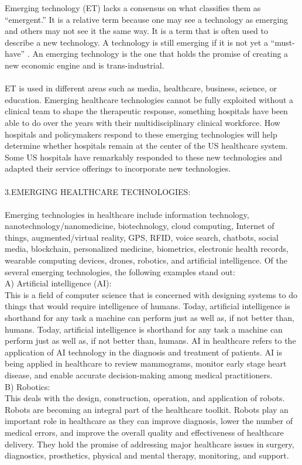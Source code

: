 \documentclass{article}
\begin{document}
Emerging technology (ET) lacks a consensus on what classifies them as “emergent.” It is a relative term because one may see a 
technology as emerging and others may not see it the same way. It is a term that is often used to describe a new technology. A 
technology is still emerging if it is not yet a “must-have” . An emerging technology is the one that holds the promise of creating 
a new economic engine and is trans-industrial.\\ 
\\
ET is used in different areas such as media, healthcare, business, science, or education. Emerging healthcare technologies cannot 
be fully exploited without a clinical team to shape the therapeutic response, something hospitals have been able to do over the 
years with their multidisciplinary clinical workforce. How hospitals and policymakers respond to these emerging technologies will 
help determine whether hospitals remain at the center of the US healthcare system. Some US hospitals have remarkably responded 
to these new technologies and adapted their service offerings to incorporate new technologies.
\\
\\
3.EMERGING HEALTHCARE TECHNOLOGIES:\\
\\
Emerging technologies in healthcare include information technology, nanotechnology/nanomedicine, biotechnology, cloud 
computing, Internet of things, augmented/virtual reality, GPS, RFID, voice search, chatbots, social media, blockchain, 
personalized medicine, biometrics, electronic health records, wearable computing devices, drones, robotics, and artificial 
intelligence. Of the several emerging technologies, the following examples stand out:\\
A) Artificial intelligence (AI):\\
 This is a field of computer science that is concerned with designing systems to do things that 
would require intelligence of humans. Today, artificial intelligence is shorthand for any task a machine can perform just as 
well as, if not better than, humans. Today, artificial intelligence is shorthand for any task a machine can perform just as 
well as, if not better than, humans. AI in healthcare refers to the application of AI technology in
 the diagnosis and treatment of patients. AI is being applied in healthcare to review mammograms, monitor early stage heart
 disease, and enable accurate decision-making among medical practitioners. \\
B) Robotics:\\
This deals with the design, construction, operation, and application of robots. Robots are becoming an integral part 
of the healthcare toolkit. Robots
play an important role in healthcare as they can improve diagnosis, lower the number of medical errors, and improve the 
overall quality and effectiveness of healthcare delivery. They hold the promise of addressing major healthcare issues in 
surgery, diagnostics, prosthetics, physical and mental therapy, monitoring, and support.
\end{document}
